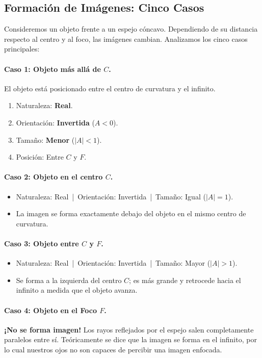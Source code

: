 \documentclass[12pt, a4paper]{article}
\theoremstyle{definition}
\begin{document}
\subsection{Formación de Imágenes: Cinco Casos}

Consideremos un objeto frente a un espejo cóncavo. Dependiendo de su distancia respecto al centro y al foco, las imágenes cambian. Analizamos los cinco casos principales:

\paragraph{Caso 1: Objeto más allá de \(C\).}
El objeto está posicionado entre el centro de curvatura y el infinito.
\begin{enumerate}
  \item Naturaleza: \textbf{Real}.
  \item Orientación: \textbf{Invertida} (\(A < 0\)).
  \item Tamaño: \textbf{Menor} (\(|A| < 1\)).
  \item Posición: Entre \(C\) y \(F\).
\end{enumerate}

\paragraph{Caso 2: Objeto en el centro \(C\).}
\begin{itemize}
  \item Naturaleza: Real \,|\, Orientación: Invertida \,|\, Tamaño: Igual (\(|A| = 1\)).
  \item La imagen se forma exactamente debajo del objeto en el mismo centro de curvatura.
\end{itemize}

\paragraph{Caso 3: Objeto entre \(C\) y \(F\).}
\begin{itemize}
  \item Naturaleza: Real \,|\, Orientación: Invertida \,|\, Tamaño: Mayor (\(|A| > 1\)).
  \item Se forma a la izquierda del centro \(C\); es más grande y retrocede hacia el infinito a medida que el objeto avanza.
\end{itemize}

\paragraph{Caso 4: Objeto en el Foco \(F\).}
\textbf{¡No se forma imagen!} Los rayos reflejados por el espejo salen completamente paralelos entre sí. Teóricamente se dice que la imagen se forma en el infinito, por lo cual nuestros ojos no son capaces de percibir una imagen enfocada.
\end{document}
